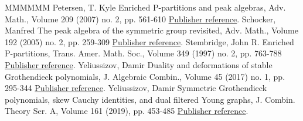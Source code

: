 \begin{thebibliography}{MMMMMM}
 Petersen, T. Kyle Enriched P-partitions and peak algebras, Adv. Math., Volume 209 (2007) no. 2, pp. 561-610 \href{https://alco.centre-mersenne.org/articles/10.5802/alco.362/#Petersen}{Publisher reference}.
 Schocker, Manfred The peak algebra of the symmetric group revisited, Adv. Math., Volume 192 (2005) no. 2, pp. 259-309 \href{https://alco.centre-mersenne.org/articles/10.5802/alco.362/#Schocker}{Publisher reference}.
 Stembridge, John R. Enriched P-partitions, Trans. Amer. Math. Soc., Volume 349 (1997) no. 2, pp. 763-788 \href{https://alco.centre-mersenne.org/articles/10.5802/alco.362/#Stembridge1997a}{Publisher reference}.
 Yeliussizov, Damir Duality and deformations of stable Grothendieck polynomials, J. Algebraic Combin., Volume 45 (2017) no. 1, pp. 295-344 \href{https://alco.centre-mersenne.org/articles/10.5802/alco.362/#Yeliussizov2017}{Publisher reference}.
 Yeliussizov, Damir Symmetric Grothendieck polynomials, skew Cauchy identities, and dual filtered Young graphs, J. Combin. Theory Ser. A, Volume 161 (2019), pp. 453-485 \href{https://alco.centre-mersenne.org/articles/10.5802/alco.362/#Yeliussizov2019}{Publisher reference}.
\end{thebibliography}
